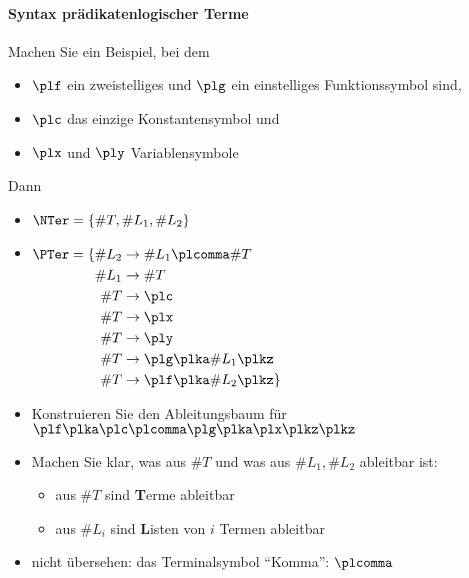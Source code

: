 \begin{tutorium}
  \paragraph{Syntax prädikatenlogischer Terme}

  Machen Sie ein Beispiel, bei dem
  \begin{itemize}
  \item $\plf$ ein zweistelliges und $\plg$ ein einstelliges
    Funktionssymbol sind,
  \item $\plc$ das einzige Konstantensymbol und
  \item $\plx$ und $\ply$ Variablensymbole
  \end{itemize}
  Dann
  \begin{itemize}
  \item $\NTer=\{ \#T, \#L_1, \#L_2 \}$
  \item $\begin{aligned}[t]
      \PTer=\{  \#L_2 & \to \#L_1\plcomma\#T \\
                \#L_1 & \to \#T  \\
                \#T   & \to \plc \\
                \#T   & \to \plx \\
                \#T   & \to \ply \\
                \#T   & \to \plg\plka \#L_1 \plkz \\
                \#T   & \to \plf\plka \#L_2 \plkz \}
              \end{aligned}
              $
  \end{itemize}


  \begin{itemize}
  \item Konstruieren Sie \zB den Ableitungsbaum für
    $\plf\plka\plc\plcomma\plg\plka\plx\plkz\plkz$
  \item Machen Sie klar, was aus $\#T$ und was aus $\#L_1,\#L_2$
    ableitbar ist:
    \begin{itemize}
    \item aus $\#T$ sind \textbf{T}erme ableitbar
    \item aus $\#L_i$ sind \textbf{L}isten von $i$ Termen ableitbar
    \end{itemize}
  \item nicht übersehen: das Terminalsymbol "`Komma"': $\plcomma$
  \end{itemize}
\end{tutorium}

